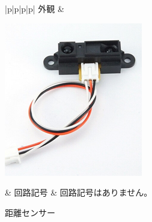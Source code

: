 \begin{figure}[H]
	\begin{tabular}{|p{\colH}|p{\colI}|p{\colH}|p{\colI}|} \hline
	外観 & 
	\begin{minipage}[t]{\linewidth}
    \smallskip
      \centering
      \includegraphics[width=\linewidth]{images/chap05/text05-img031.png}
      \caption{距離センサー}
      \smallskip
    \end{minipage} &
    回路記号 & 回路記号はありません。\\ \hline
  \end{tabular}
\end{figure}
